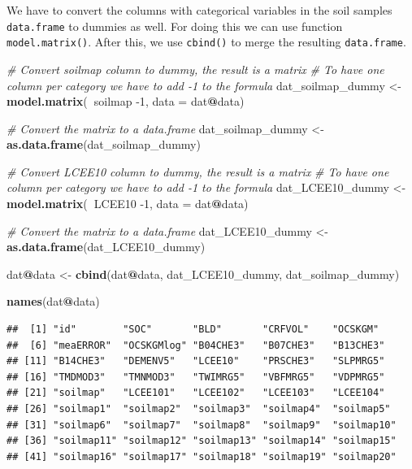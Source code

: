 \documentclass[10pt,b5paper,]{book}
\newenvironment{Shaded}{\begin{snugshade}}{\end{snugshade}}
\newcommand{\CommentTok}[1]{\textcolor[rgb]{0.56,0.35,0.01}{\textit{#1}}}
\newcommand{\DataTypeTok}[1]{\textcolor[rgb]{0.13,0.29,0.53}{#1}}
\newcommand{\DecValTok}[1]{\textcolor[rgb]{0.00,0.00,0.81}{#1}}
\newcommand{\KeywordTok}[1]{\textcolor[rgb]{0.13,0.29,0.53}{\textbf{#1}}}
\newcommand{\NormalTok}[1]{#1}
\newcommand{\OperatorTok}[1]{\textcolor[rgb]{0.81,0.36,0.00}{\textbf{#1}}}
\newcommand{\StringTok}[1]{\textcolor[rgb]{0.31,0.60,0.02}{#1}}
\theoremstyle{definition}
\theoremstyle{definition}
\theoremstyle{definition}
\theoremstyle{remark}
\begin{document}
We have to convert the columns with categorical variables in the soil
samples \texttt{data.frame} to dummies as well. For doing this we can
use function \texttt{model.matrix()}. After this, we use
\texttt{cbind()} to merge the resulting \texttt{data.frame}.

\begin{Shaded}
\begin{Highlighting}[]
\CommentTok{# Convert soilmap column to dummy, the result is a matrix}
\CommentTok{# To have one column per category we have to add -1 to the formula}
\NormalTok{dat_soilmap_dummy <-}\StringTok{ }\KeywordTok{model.matrix}\NormalTok{(}\OperatorTok{~}\NormalTok{soilmap }\DecValTok{-1}\NormalTok{, }\DataTypeTok{data =}\NormalTok{ dat}\OperatorTok{@}\NormalTok{data)}

\CommentTok{# Convert the matrix to a data.frame}
\NormalTok{dat_soilmap_dummy <-}\StringTok{ }\KeywordTok{as.data.frame}\NormalTok{(dat_soilmap_dummy)}

\CommentTok{# Convert LCEE10 column to dummy, the result is a matrix}
\CommentTok{# To have one column per category we have to add -1 to the formula}
\NormalTok{dat_LCEE10_dummy <-}\StringTok{ }\KeywordTok{model.matrix}\NormalTok{(}\OperatorTok{~}\NormalTok{LCEE10 }\DecValTok{-1}\NormalTok{, }\DataTypeTok{data =}\NormalTok{ dat}\OperatorTok{@}\NormalTok{data)}

\CommentTok{# Convert the matrix to a data.frame}
\NormalTok{dat_LCEE10_dummy <-}\StringTok{ }\KeywordTok{as.data.frame}\NormalTok{(dat_LCEE10_dummy)}

\NormalTok{dat}\OperatorTok{@}\NormalTok{data <-}\StringTok{ }\KeywordTok{cbind}\NormalTok{(dat}\OperatorTok{@}\NormalTok{data, dat_LCEE10_dummy, dat_soilmap_dummy)}

\KeywordTok{names}\NormalTok{(dat}\OperatorTok{@}\NormalTok{data)}
\end{Highlighting}
\end{Shaded}

\begin{verbatim}
##  [1] "id"        "SOC"       "BLD"       "CRFVOL"    "OCSKGM"   
##  [6] "meaERROR"  "OCSKGMlog" "B04CHE3"   "B07CHE3"   "B13CHE3"  
## [11] "B14CHE3"   "DEMENV5"   "LCEE10"    "PRSCHE3"   "SLPMRG5"  
## [16] "TMDMOD3"   "TMNMOD3"   "TWIMRG5"   "VBFMRG5"   "VDPMRG5"  
## [21] "soilmap"   "LCEE101"   "LCEE102"   "LCEE103"   "LCEE104"  
## [26] "soilmap1"  "soilmap2"  "soilmap3"  "soilmap4"  "soilmap5" 
## [31] "soilmap6"  "soilmap7"  "soilmap8"  "soilmap9"  "soilmap10"
## [36] "soilmap11" "soilmap12" "soilmap13" "soilmap14" "soilmap15"
## [41] "soilmap16" "soilmap17" "soilmap18" "soilmap19" "soilmap20"
\end{verbatim}
\end{document}
